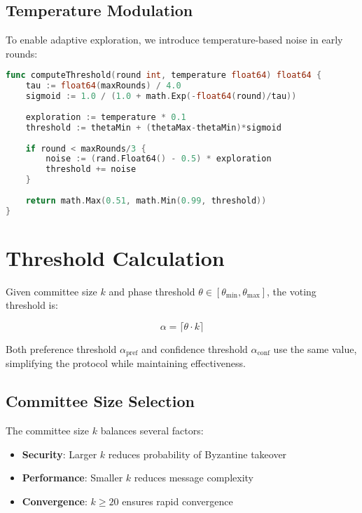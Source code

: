 \documentclass[11pt,a4paper]{article}
\begin{document}
\subsection{Temperature Modulation}

To enable adaptive exploration, we introduce temperature-based noise in early rounds:

\begin{lstlisting}[language=Go, caption=Temperature-modulated threshold computation]
func computeThreshold(round int, temperature float64) float64 {
    tau := float64(maxRounds) / 4.0
    sigmoid := 1.0 / (1.0 + math.Exp(-float64(round)/tau))
    
    exploration := temperature * 0.1
    threshold := thetaMin + (thetaMax-thetaMin)*sigmoid
    
    if round < maxRounds/3 {
        noise := (rand.Float64() - 0.5) * exploration
        threshold += noise
    }
    
    return math.Max(0.51, math.Min(0.99, threshold))
}
\end{lstlisting}

\section{Threshold Calculation}
\label{sec:threshold}

Given committee size $k$ and phase threshold $\theta \in [\theta_{\min}, \theta_{\max}]$, the voting threshold is:

\begin{equation}
\alpha = \lceil \theta \cdot k \rceil
\label{eq:alpha}
\end{equation}

Both preference threshold $\alpha_{\text{pref}}$ and confidence threshold $\alpha_{\text{conf}}$ use the same value, simplifying the protocol while maintaining effectiveness.

\subsection{Committee Size Selection}

The committee size $k$ balances several factors:

\begin{itemize}
\item \textbf{Security}: Larger $k$ reduces probability of Byzantine takeover
\item \textbf{Performance}: Smaller $k$ reduces message complexity
\item \textbf{Convergence}: $k \geq 20$ ensures rapid convergence
\end{itemize}
\end{document}
